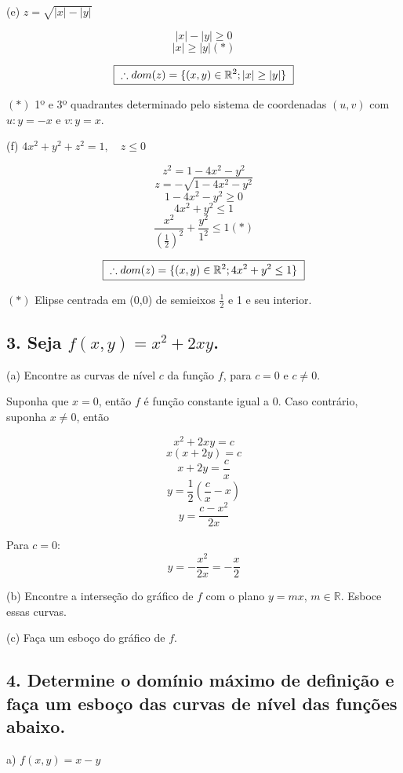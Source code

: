 \documentclass{article}
\newcommand{\n}{\phantom{}}
\renewcommand{\d}[1]{\displaystyle{#1}}
\begin{document}
        (e) $\d{ z = \sqrt{|x| - |y|} }$

        \[|x| - |y| \geq 0\]
        \[|x| \geq |y| (*)\]

        \[\fbox{ $\d{ \therefore dom(z) = \{(x,y) \in \mathbb{R}^2; |x| \geq |y|\} }$ }\]

        $(*)$ 1º e 3º quadrantes determinado pelo sistema de coordenadas $(u,v)$ com $u: y = -x$ e $v: y = x$.

        \n

        (f) $\d{ 4x^2 + y^2 + z^2 = 1, \quad z \leq 0 }$

        \[z^2 = 1 - 4x^2 - y^2\]
        \[z = -\sqrt{1 - 4x^2 - y^2}\]
        \[1 - 4x^2 - y^2 \geq 0\]
        \[4x^2 + y^2 \leq 1\]
        \[\frac{x^2}{\left( \frac{1}{2} \right)^2} + \frac{y^2}{1^2} \leq 1 (*)\]

        \[\fbox{ $\d{ \therefore dom(z) = \{(x,y) \in \mathbb{R}^2; 4x^2 + y^2 \leq 1\} }$ }\]

        $(*)$ Elipse centrada em (0,0) de semieixos $\frac{1}{2}$ e 1 e seu interior.

        \n

    \subsection*{3. Seja $f(x, y) = x^2 + 2xy$.}
        \hspace*{12px}
        (a) Encontre as curvas de nível $c$ da função $f$, para $c = 0$ e $c \neq 0$.

        Suponha que $x = 0$, então $f$ é função constante igual a $0$. Caso contrário, suponha $x \neq 0$, então

        \[x^2 + 2xy = c\]
        \[x(x + 2y) = c\]
        \[x + 2y = \frac{c}{x}\]
        \[y = \frac{1}{2} \left(\frac{c}{x} - x\right)\]
        \[y = \frac{c-x^2}{2x}\]

        Para $c = 0$:
        \[y = -\frac{x^2}{2x} = -\frac{x}{2}\]

        (b) Encontre a interseção do gráfico de $f$ com o plano $y = mx$, $m \in \mathbb{R}$. Esboce essas curvas.

        (c) Faça um esboço do gráfico de $f$.

    \subsection*{4. Determine o domínio máximo de definição e faça um esboço das curvas de nível das funções abaixo.}
        \hspace*{12px}
        a) $f(x, y) = x - y$
\end{document}

